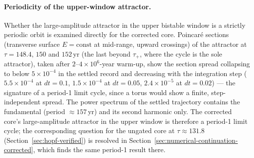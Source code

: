 \documentclass[twocolumn,10pt]{article}
\begin{document}
\paragraph{Periodicity of the upper-window attractor.} Whether the large-amplitude attractor in the upper bistable window is a strictly periodic orbit is examined directly for the corrected core. Poincar\'e sections (transverse surface $E=\text{const}$ at mid-range, upward crossings) of the attractor at $\tau=148.4$, $150$ and $152$\,yr (the last beyond $\tau_+$, where the cycle is the sole attractor), taken after $2$--$4\times10^6$-year warm-up, show the section spread collapsing to below $5\times10^{-4}$ in the settled record and decreasing with the integration step ($5.5\times10^{-4}$ at $dt=0.1$, $1.5\times10^{-4}$ at $dt=0.05$, $2.4\times10^{-5}$ at $dt=0.02$) --- the signature of a period-1 limit cycle, since a torus would show a finite, step-independent spread. The power spectrum of the settled trajectory contains the fundamental (period $\approx157$\,yr) and its second harmonic only. The corrected core's large-amplitude attractor in the upper window is therefore a period-1 limit cycle; the corresponding question for the ungated core at $\tau\approx131.8$ (Section~\ref{sec:hopf-verified}) is resolved in Section~\ref{sec:numerical-continuation-corrected}, which finds the same period-1 result there.
\end{document}
